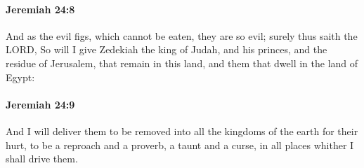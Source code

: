 		\paragraph{Jeremiah 24:8} %
			\label{JEREMIAH-24-8}

			And as the evil figs, which cannot be eaten, they are so evil; surely thus saith the LORD, So will I give Zedekiah the king of Judah, and his princes, and the residue of Jerusalem, that remain in this land, and them that dwell in the land of Egypt:


		\paragraph{Jeremiah 24:9} %
			\label{JEREMIAH-24-9}

			And I will deliver them to be removed into all the kingdoms of the earth for their hurt, to be a reproach and a proverb, a taunt and a curse, in all places whither I shall drive them.

